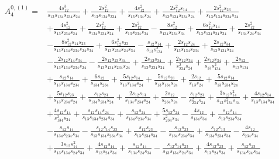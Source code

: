 \begin{align}
    A_4^{0,(1)} = {}
          & \frac{4s_{12}^3}{s_{13}s_{134}s_{234}s_{24}} + \frac{2s_{12}^2}{s_{13}s_{134}s_{234}} + \frac{4s_{12}^2}{s_{13}s_{134}s_{24}} + \frac{2s_{12}^2s_{14}}{s_{13}s_{134}s_{234}s_{24}} + \frac{2s_{12}^2s_{23}}{s_{13}s_{134}s_{234}s_{24}} \nonumber \\
  & + \frac{4s_{12}^2}{s_{13}s_{234}s_{24}} + \frac{2s_{12}^2}{s_{134}s_{234}s_{24}} + \frac{2s_{12}^2}{s_{13}s_{234}s_{34}} - \frac{8s_{12}^2}{s_{134}s_{234}s_{34}} + \frac{6s_{12}^2s_{14}}{s_{13}s_{134}s_{24}s_{34}} + \frac{2s_{12}^2}{s_{134}s_{24}s_{34}} \nonumber \\
  & - \frac{8s_{12}^2s_{14}s_{23}}{s_{13}s_{134}s_{234}s_{24}s_{34}} + \frac{6s_{12}^2s_{23}}{s_{13}s_{234}s_{24}s_{34}} - \frac{s_{12}s_{14}}{s_{13}s_{134}^2} + \frac{2s_{12}s_{24}}{s_{13}s_{134}s_{234}} + \frac{2s_{12}s_{34}}{s_{13}s_{134}s_{24}} \nonumber \\
  & - \frac{2s_{12}s_{14}s_{34}}{s_{13}s_{134}s_{234}s_{24}} - \frac{2s_{12}s_{23}s_{34}}{s_{13}s_{134}s_{234}s_{24}} + \frac{2s_{12}s_{34}}{s_{13}s_{234}s_{24}} + \frac{2s_{12}s_{34}}{s_{234}^2s_{24}} + \frac{2s_{12}s_{34}}{s_{13}s_{134}^2} + \frac{2s_{12}}{s_{13}s_{134}} \nonumber \\
  & + \frac{s_{12}s_{14}}{s_{13}s_{134}s_{234}} + \frac{6s_{12}}{s_{134}s_{234}} + \frac{5s_{12}s_{14}}{s_{13}s_{134}s_{24}} + \frac{5s_{12}s_{23}}{s_{13}s_{134}s_{24}} + \frac{2s_{12}}{s_{13}s_{24}} + \frac{5s_{12}s_{14}}{s_{13}s_{234}s_{24}} \nonumber \\
  & + \frac{5s_{12}s_{23}}{s_{13}s_{234}s_{24}} + \frac{s_{12}s_{23}}{s_{134}s_{234}s_{24}} + \frac{2s_{12}s_{13}}{s_{134}s_{234}s_{24}} + \frac{2s_{12}}{s_{234}s_{24}} - \frac{s_{12}s_{23}}{s_{234}^2s_{24}} + \frac{3s_{12}s_{14}^2}{s_{13}s_{134}^2s_{34}} + \frac{4s_{12}s_{14}}{s_{13}s_{134}s_{34}} \nonumber \\
  & + \frac{4s_{12}s_{14}}{s_{134}^2s_{34}} + \frac{s_{12}s_{14}s_{24}}{s_{13}s_{134}s_{234}s_{34}} + \frac{s_{12}s_{24}}{s_{134}s_{234}s_{34}} + \frac{5s_{12}s_{24}}{s_{234}^2s_{34}} - \frac{4s_{12}}{s_{134}s_{34}} + \frac{s_{12}s_{14}}{s_{13}s_{234}s_{34}} \nonumber \\
  & - \frac{s_{12}s_{14}}{s_{134}s_{234}s_{34}} - \frac{s_{12}s_{14}s_{23}}{s_{13}s_{134}s_{234}s_{34}} + \frac{s_{12}s_{23}}{s_{13}s_{234}s_{34}} - \frac{s_{12}s_{23}}{s_{134}s_{234}s_{34}} + \frac{s_{12}s_{13}}{s_{134}s_{234}s_{34}} - \frac{4s_{12}}{s_{234}s_{34}} \nonumber \\
  & + \frac{3s_{12}s_{14}^2}{s_{13}s_{134}s_{24}s_{34}} + \frac{4s_{12}s_{14}}{s_{13}s_{24}s_{34}} + \frac{s_{12}s_{14}}{s_{134}s_{24}s_{34}} - \frac{s_{12}s_{14}s_{23}}{s_{13}s_{134}s_{24}s_{34}} + \frac{4s_{12}s_{23}}{s_{13}s_{24}s_{34}} + \frac{s_{12}s_{23}}{s_{134}s_{24}s_{34}} \nonumber \\

\end{align}
